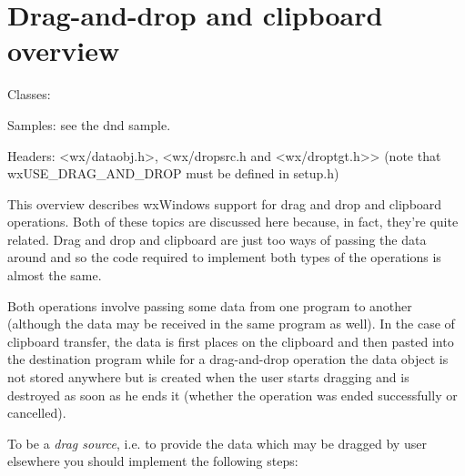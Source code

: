 \section{Drag-and-drop and clipboard overview}\label{wxdndoverview}

Classes: 


Samples: see the dnd sample.

Headers: <wx/dataobj.h>, <wx/dropsrc.h and <wx/droptgt.h>>
(note that wxUSE\_DRAG\_AND\_DROP must be defined in setup.h)

This overview describes wxWindows support for drag and drop and clipboard
operations. Both of these topics are discussed here because, in fact, they're
quite related. Drag and drop and clipboard are just too ways of passing the
data around and so the code required to implement both types of the operations
is almost the same.

Both operations involve passing some data from one program to another
(although the data may be received in the same program as well). In the case
of clipboard transfer, the data is first places on the clipboard and then
pasted into the destination program while for a drag-and-drop operation the
data object is not stored anywhere but is created when the user starts
dragging and is destroyed as soon as he ends it (whether the operation was
ended successfully or cancelled).

To be a {\it drag source}, i.e. to provide the data which may be dragged by
user elsewhere you should implement the following steps:

